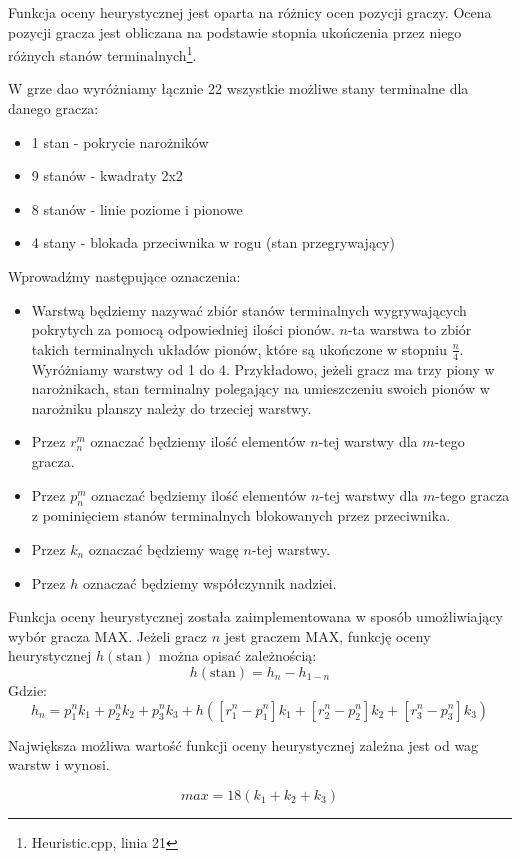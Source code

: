 \documentclass{scrartcl}
\begin{document}
Funkcja oceny heurystycznej jest oparta na różnicy ocen pozycji graczy.
Ocena pozycji gracza jest obliczana na podstawie stopnia ukończenia
przez niego różnych stanów terminalnych\footnote{Heuristic.cpp, 
linia 21}.

W grze dao wyróżniamy łącznie 22 wszystkie możliwe stany terminalne dla danego gracza:
\begin{itemize}
\item 1 stan - pokrycie narożników
\item 9 stanów - kwadraty 2x2
\item 8 stanów - linie poziome i pionowe
\item 4 stany - blokada przeciwnika w rogu (stan przegrywający)
\end{itemize}

Wprowadźmy następujące oznaczenia:
\begin{itemize}
\item Warstwą będziemy nazywać zbiór stanów terminalnych wygrywających
 pokrytych za pomocą odpowiedniej ilości pionów. $n$-ta warstwa
to zbiór takich terminalnych układów pionów, które są ukończone w 
stopniu $\frac{n}{4}$. Wyróżniamy warstwy od 1 do 4. Przykładowo, jeżeli gracz ma
trzy piony w narożnikach, stan terminalny polegający na umieszczeniu
swoich pionów w narożniku planszy należy do trzeciej warstwy.
\item Przez $r_{n}^{m}$ oznaczać będziemy ilość elementów $n$-tej warstwy dla $m$-tego gracza.
\item Przez $p_{n}^{m}$ oznaczać będziemy ilość elementów $n$-tej warstwy dla $m$-tego gracza z pominięciem stanów terminalnych blokowanych przez przeciwnika.
\item Przez $k_{n}$ oznaczać będziemy wagę $n$-tej warstwy.
\item Przez $h$ oznaczać będziemy współczynnik nadziei.
\end{itemize}

Funkcja oceny heurystycznej została zaimplementowana w sposób
umożliwiający wybór gracza MAX. Jeżeli gracz $n$ jest graczem MAX,
funkcję oceny heurystycznej $h(\text{stan})$ można opisać zależnością:
\[ h(\text{stan}) =  h_{n} - h_{1-n} \]
Gdzie:
\[ h_{n} = p_{1}^{n} k_{1} + p_{2}^{n} k_{2} + p_{3}^{n} k_{3} + h ([r_{1}^{n} - p_{1}^{n}] k_{1} + [r_{2}^{n} - p_{2}^{n}] k_{2} + [r_{3}^{n} - p_{3}^{n}] k_{3}) \]

Największa możliwa wartość funkcji oceny heurystycznej zależna jest
od wag warstw i wynosi.

\[ max = 18 ( k_{1} + k_{2} + k_{3} ) \]
\end{document}

